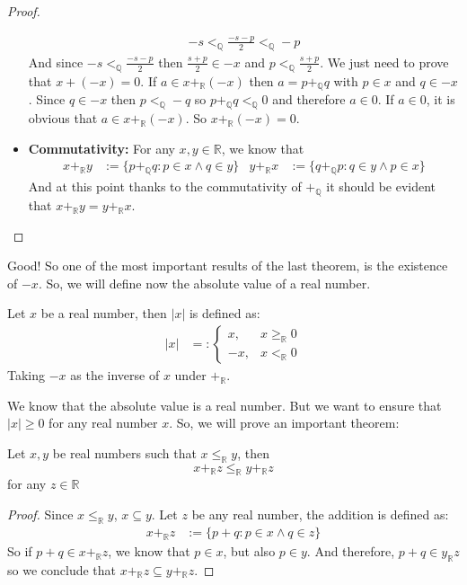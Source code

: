 \documentclass{tufte-handout}
\begin{document}
\begin{proof}
\begin{itemize}
		\begin{align*}
			-s <_\mathbb{Q} \frac{-s-p}{2} <_\mathbb{Q} -p
		\end{align*}
		And since $-s <_\mathbb{Q} \frac{-s-p}{2}$ then $\frac{s+p}{2} \in -x$ and $p <_\mathbb{Q} \frac{s+p}{2}$. We just need to prove that $x + (-x) = 0$. If $a \in x +_\mathbb{R} (-x)$ then $a = p +_\mathbb{Q} q$ with $p \in x$ and $q \in -x$. Since $q \in -x$ then $p <_\mathbb{Q} -q$ so $p+_\mathbb{Q} q <_\mathbb{Q} 0$ and therefore $a \in 0$. If $a \in 0$, it is obvious that $a \in x +_\mathbb{R} (-x)$. So $x +_\mathbb{R} (-x) = 0$.
		\item \textbf{Commutativity:} For any $x, y \in \mathbb{R}$, we know that
		\begin{align*}
			x +_\mathbb{R} y &:= \{p +_\mathbb{Q} q : p \in x \wedge q \in y\} & y +_\mathbb{R} x &:= \{q +_\mathbb{Q} p: q \in y \wedge p \in x\}
		\end{align*}
		And at this point thanks to the commutativity of $+_\mathbb{Q}$ it should be evident that $x +_\mathbb{R} y = y +_\mathbb{R} x$. 
	\end{itemize}
\end{proof}

Good! So one of the most important results of the last theorem, is the existence of $-x$. So, we will define now the absolute value of a real number.
\begin{definition}
	Let $x$ be a real number, then $|x|$ is defined as:
	\begin{align*}
		|x| &=: \begin{cases}
			x, & x \ge_\mathbb{R} 0\\
			-x, & x <_\mathbb{R} 0
		\end{cases}
	\end{align*}
	Taking $-x$ as the inverse of $x$ under $+_\mathbb{R}$.
\end{definition}

We know that the absolute value is a real number. But we want to ensure that $|x| \ge 0$ for any real number $x$. So, we will prove an important theorem:
\begin{theorem}
	Let $x, y$ be real numbers such that $x \le_\mathbb{R} y$, then
	$$ x +_\mathbb{R} z \le_\mathbb{R} y +_\mathbb{R} z $$ for any $z \in \mathbb{R}$
\end{theorem}
\begin{proof}
	Since $x \le_\mathbb{R} y$, $x \subseteq y$. Let $z$ be any real number, the addition is defined as:
	\begin{align*}
		x +_\mathbb{R} z &:= \{p + q: p \in x \wedge q \in z\}
	\end{align*}
	So if $p + q \in x+_\mathbb{R} z$, we know that $p \in x$, but also $p \in y$. And therefore, $p + q \in y_\mathbb{R} z$ so we conclude that $x +_\mathbb{R} z \subseteq y +_\mathbb{R} z$.
\end{proof}
\end{document}
